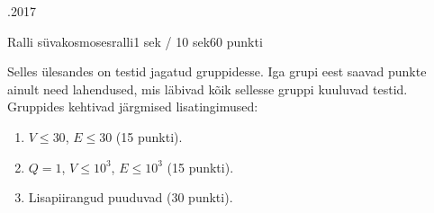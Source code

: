 \documentclass[a4paper,10pt]{article}
\begin{document}
\begin{ol}{\eio}{.2017}{\yle}{}
\begin{yl}{5}{Ralli süvakosmoses}{ralli}{1 sek / 10 sek}{60 punkti}
\nde[0]{3cm}{3cm}

\hnd Selles ülesandes on testid jagatud gruppidesse. Iga grupi eest saavad punkte ainult need lahendused, mis läbivad kõik sellesse gruppi kuuluvad testid. Gruppides kehtivad järgmised lisatingimused:

\begin{enumerate}
\item $V \le 30$, $E \le 30$ (15 punkti).
\item $Q = 1$, $V \le 10^3$, $E \le 10^3$ (15 punkti).
\item Lisapiirangud puuduvad (30 punkti).
\end{enumerate}

\end{yl}
\end{ol}
\end{document}
